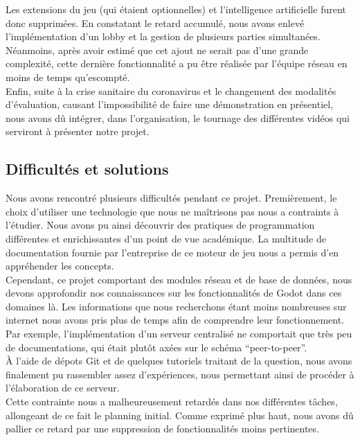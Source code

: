\documentclass[a4paper,11pt]{article}
\begin{document}
    Les extensions du jeu (qui étaient optionnelles) et l'intelligence artificielle furent donc supprimées. En constatant le retard accumulé, nous avons enlevé l’implémentation d’un lobby et la gestion de plusieurs parties simultanées.  \\

    Néanmoins, après avoir estimé que cet ajout ne serait pas d’une grande complexité, cette dernière fonctionnalité a pu être réalisée par l’équipe réseau en moins de temps qu’escompté. \\

    Enfin, suite à la crise sanitaire du coronavirus et le changement des modalités d’évaluation, causant l’impossibilité de faire une démonstration en présentiel, nous avons dû intégrer, dans l’organisation, le tournage des différentes vidéos qui serviront à présenter notre projet. 

\subsection{Difficultés et solutions}

	Nous avons rencontré plusieurs difficultés pendant ce projet. Premièrement, le choix d’utiliser une technologie que nous ne maîtrisons pas nous a contraints à l’étudier. Nous avons pu ainsi découvrir des pratiques de programmation différentes et enrichissantes d’un point de vue académique. La multitude de documentation fournie par l’entreprise de ce moteur de jeu nous a permis d’en appréhender les concepts. \\

	Cependant, ce projet comportant des modules réseau et de base de données, nous devons approfondir nos connaissances sur les fonctionnalités de Godot dans ces domaines là. Les informations que nous recherchons étant moins nombreuses sur internet nous avons pris plus de temps afin de comprendre leur fonctionnement. Par exemple, l’implémentation d’un serveur centralisé ne comportait que très peu de documentations, qui était plutôt axées sur le schéma “peer-to-peer”. \\

	À l’aide de dépots Git et de quelques tutoriels traitant de la question, nous avons finalement pu rassembler assez d’expériences, nous permettant ainsi de procéder à l’élaboration de ce serveur. \\

	Cette contrainte nous a malheureusement retardés dans nos différentes tâches, allongeant de ce fait le planning initial. Comme exprimé plus haut, nous avons dû pallier ce retard par une suppression de fonctionnalités moins pertinentes. \\
\end{document}

